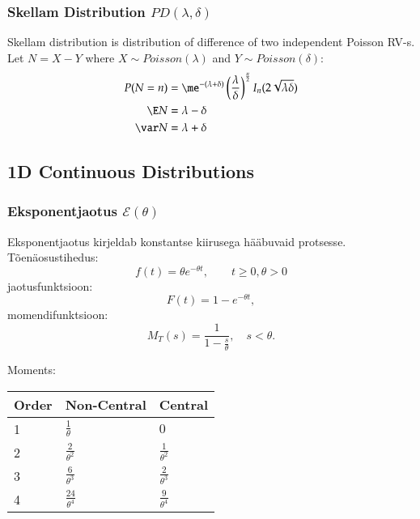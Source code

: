 \documentclass[a4paper]{article}
\numberwithin{equation}{subsection}
\begin{document}

\subsubsection{Skellam Distribution $PD(\lambda,\delta)$}
\label{sec:skellam_distribution}

Skellam distribution is distribution of difference of two independent
Poisson RV-s.  Let $N = X - Y$ where $X \sim Poisson(\lambda)$ and $Y
\sim Poisson(\delta)$:
\begin{align}
  P(N=n) &= 
  \me^{-(\lambda + \delta)}
  \left(\frac{\lambda}{\delta} \right)^{\frac{n}{2}}
  I_{n}(2\sqrt{\lambda\delta})
  \\
  \E N &= \lambda - \delta
  \\
  \var N &= \lambda + \delta
\end{align}



\newpage
\subsection{1D Continuous Distributions}

\subsubsection{Eksponentjaotus $\mathcal{E}(\theta)$}
Eksponentjaotus kirjeldab konstantse kiirusega hääbuvaid protsesse.
Tõenäosustihedus:
\begin{equation}
f(t) = \theta e^{-\theta t}, \qquad t \ge 0, \theta > 0
\end{equation}
jaotusfunktsioon:
\begin{equation}
F(t) = 1 - e^{-\theta t},
\end{equation}
momendifunktsioon:
\begin{equation}
M_T (s) = \frac{1}{1-\frac{s}{\theta}}, \quad s<\theta.
\end{equation}

Moments:
\begin{center}
  \begin{tabular}{lll}
    \toprule
    Order & Non-Central & Central\\
    \midrule
    1 & $\displaystyle\frac{1}{\theta}$ & $0$ \\[1.4ex]
    2 & $\displaystyle\frac{2}{\theta^{2}}$ & $\displaystyle\frac{1}{\theta^{2}}$
    \\[1.4ex]
    3 & $\displaystyle \frac{6}{\theta^{3}}$  & $\displaystyle\frac{2}{\theta^{3}}$\\[1.3ex]
    4 & $\displaystyle \frac{24}{\theta^{4}}$ & $\displaystyle\frac{9}{\theta^{4}}$ \\
    \bottomrule
  \end{tabular}
\end{center}
\end{document}
